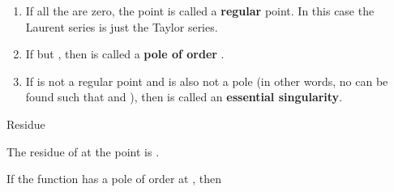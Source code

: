 
\begin{EMunit}

\begin{enumerate}
\def\labelenumi{\arabic{enumi}.}
\tightlist
\item
  If all the  are zero, the point  is called a \textbf{regular} point. In this case the Laurent series is just the Taylor series.
\item
  If  but , then  is called a \textbf{pole of order }.
\item
  If  is not a regular point and is also not a pole (in other words, no  can be found such that  and ), then  is called an \textbf{essential singularity}.
\end{enumerate}

\end{EMunit}

\EMhold


\begin{EMdefinition}{Residue}

The residue of  at the point  is .

\end{EMdefinition}

\begin{EMtheorem}{}

If the function  has a pole of order  at , then

\end{EMtheorem}

